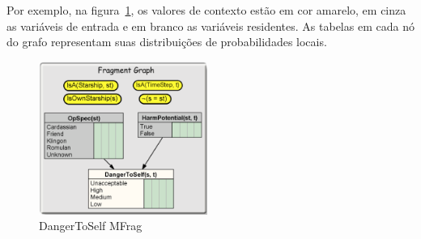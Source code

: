 Por exemplo, na figura~\ref{fig:mfrag}, os valores de contexto estão em cor amarelo, em cinza as variáveis de entrada e em branco as variáveis residentes. As tabelas em cada nó do grafo representam suas distribuições de probabilidades locais.

\begin{figure}
	\centering
	\includegraphics[height=5cm]{./images/mfrag}
	\caption{DangerToSelf MFrag}
	\label{fig:mfrag}
\end{figure}